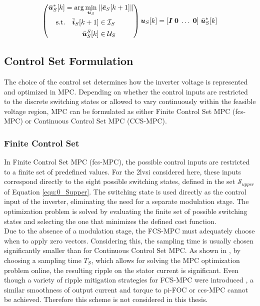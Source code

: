 \begin{equation*}
	 \left( 
    \begin{split}
        \bar{\bm{u}}_S^*[k] = \arg \min_{\Bar{\bm{ u}_S}}\; &  \|  \Bar{\bm e}_S[k+1] \|\\
    	 \text{s.t.} \quad \bar{\boldsymbol{i}}_{S}[k+1] &\in \mathcal{I}_S \\
    	  \bar{\boldsymbol{u}}_{S}^S[k] &\in \mathcal{U}_{S} 
    \end{split}
    \right)\\
    \bm{u}_S[k] = [\bm{I}\; \bm{0} \; \hdots \; \bm{0}] \; \bar{\bm{u}}_S^*[k]
\end{equation*}
\subsection{Control Set Formulation}

The choice of the control set determines how the inverter voltage is represented and optimized in MPC. Depending on whether the control inputs are restricted to the discrete switching states or allowed to vary continuously within the feasible voltage region, MPC can be formulated as either Finite Control Set MPC (\acrshort{fcs}-MPC) or Continuous Control Set MPC (CCS-MPC).

\subsubsection{Finite Control Set}

In Finite Control Set MPC (\acrshort{fcs}-MPC), the possible control inputs are restricted to a finite set of predefined values. For the \acrshort{2lvsi} considered here, these inputs correspond directly to the eight possible switching states, defined in the set $\mathcal{S}_{upper}$ of Equation \eqref{equ:0_Supper}. The switching state is used directly as the control input of the inverter, eliminating the need for a separate modulation stage. The optimization problem is solved by evaluating the finite set of possible switching states and selecting the one that minimizes the defined cost function.\\ %
Due to the absence of a modulation stage, the FCS-MPC must adequately choose when to apply zero vectors. Considering this, the sampling time is usually chosen significantly smaller than for Continuous Control Set MPC.
As shown in \cite{NeunerMA} \cite{FCSCompBoek}, by choosing a sampling time $T_S$, which allows for solving the MPC optimization problem online, the resulting ripple on  the stator current is significant. Even though a variety of ripple mitigation strategies for FCS-MPC were introduced \cite{FCSCompLi}, a similar smoothness of output current and torque to \acrshort{pi}-FOC or \acrshort{ccs}-MPC cannot be achieved. Therefore this scheme is not considered in this thesis.


